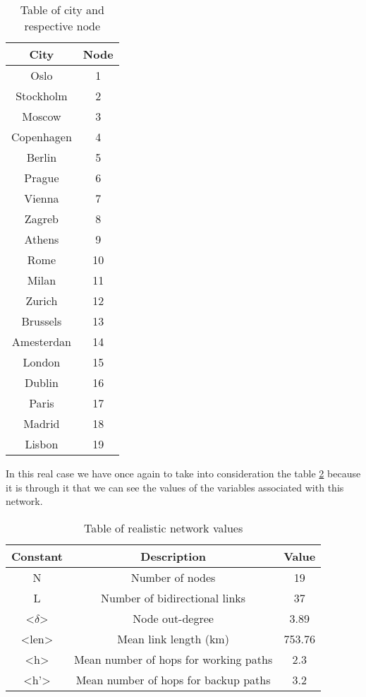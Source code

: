 \begin{table}[h!]
\centering
\begin{tabular}{|| c | c ||}
 \hline
 City & Node \\
 \hline\hline
 Oslo & 1 \\
 Stockholm & 2 \\
 Moscow & 3 \\
 Copenhagen & 4 \\
 Berlin & 5 \\
 Prague & 6 \\
 Vienna & 7 \\
 Zagreb & 8 \\
 Athens & 9 \\
 Rome & 10 \\
 Milan & 11 \\
 Zurich & 12 \\
 Brussels & 13 \\
 Amesterdan & 14 \\
 London & 15 \\
 Dublin & 16 \\
 Paris & 17 \\
 Madrid & 18 \\
 Lisbon & 19 \\
 \hline
\end{tabular}
\caption{Table of city and respective node}
\label{city_nodes_t}
\end{table}

In this real case we have once again to take into consideration the table \ref{table:4} because it is through it that we can see the values of the variables associated with this network.

\begin{table}[h!]
\centering
\begin{tabular}{|| c | c | c||}
 \hline
 Constant & Description & Value \\
 \hline\hline
 N & Number of nodes & 19 \\
 L & Number of bidirectional links & 37 \\
 <$\delta$> & Node out-degree & 3.89 \\
 <len> & Mean link length (km) & 753.76 \\
 <h> & Mean number of hops for working paths & 2.3 \\
 <h'> & Mean number of hops for backup paths & 3.2 \\
 \hline
\end{tabular}
\caption{Table of realistic network values}
\label{table:4}
\end{table}

